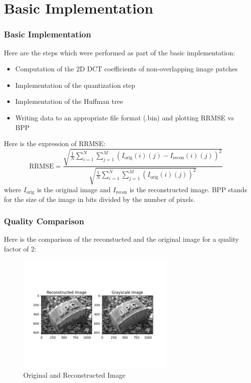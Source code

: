 \documentclass[Serif, 10pt, brown]{beamer}
\theoremstyle{example}
\theoremstyle{plain}
\begin{document}
\section{Basic Implementation}
\begin{frame}
	\frametitle{Basic Implementation}
	Here are the steps which were performed as part of the basic implementation:
	\begin{itemize}
		\item Computation of the 2D DCT coefficients of non-overlapping image patches
		\item Implementation of the quantization step
		\item Implementation of the Huffman tree
		\item Writing data to an appropriate file format (.bin) and plotting RRMSE vs BPP
	\end{itemize}
	Here is the expression of RRMSE:
	\begin{equation}
		\text{RRMSE} = \frac{\sqrt{\frac{1}{N} \sum_{i=1}^{N}\sum_{j=1}^{M} (I_{\text{orig}}(i)(j) - I_{\text{recon}}(i)(j))^2}}{\sqrt{\frac{1}{N} \sum_{i=1}^{N}\sum_{j=1}^{M} (I_{\text{orig}}(i)(j))^2}}
	\end{equation}
	where $I_{\text{orig}}$ is the original image and $I_{\text{recon}}$ is the reconstructed image. BPP stands for the size of the image in bits divided by the number of pixels.
\end{frame}
\begin{frame}
	\frametitle{Quality Comparison}
	Here is the comparison of the reconstucted and the original image for a quality factor of 2:
	\begin{figure}
		\centering
		\includegraphics[width=0.7\textwidth]{../results/Quality: 2_comparison.png}
		\caption{Original and Reconstructed Image}
	\end{figure}
\end{frame}
\end{document}
